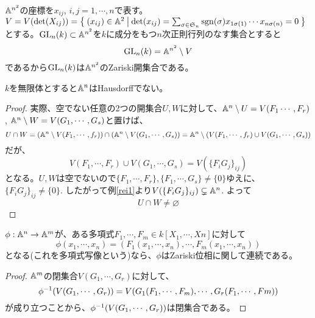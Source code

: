 \documentclass{ltjsreport}
\begin{document}
\begin{eg}
  $\mathbb{A}^{n^2}$の座標を$x_{ij}$, $i,j=1,\cdots,n$で表す。\\$V=V(\det (X_{ij}))=\left\{\:(x_{ij})\in\mathbb{A}^2\:\middle|\:\det(x_{ij})=\sum_{\sigma\in\mathfrak{S}_n}\mathrm{sgn}(\sigma)x_{1\sigma(1)}\cdots x_{n\sigma(n)}=0\:\right\}$とする。$\text{GL}_n(k)\subset \mathbb{A}^{n^2}$を$k$に成分をもつ$n$次正則行列のなす集合とすると
  \[
  \text{GL}_n(k)=\mathbb{A}^{n^2}\setminus V  
  \]
  であるから$\text{GL}_n(k)$は$\mathbb{A}^{n^2}$のZariski開集合である。
\end{eg}

\begin{prop}
  $k$を無限体とすると$\mathbb{A}^n$はHausdorffでない。
\end{prop}

\begin{proof}
  実際、空でない任意の2つの開集合$U,W$に対して、$\mathbb{A}^n\setminus U=V(F_1\cdots,F_r)$, $\mathbb{A}^n\setminus W=V(G_1,\cdots,G_s)$と置けば、
  \[
  U\cap W=(\mathbb{A}^n \setminus V(F_1,\cdots,f_r))\cap (\mathbb{A}^n \setminus V(G_1,\cdots,G_s))=\mathbb{A}^n\setminus(V(F_1,\cdots,f_r)\cup V(G_1,\cdots,G_s))  
  \]
  だが、
  \[
    V(F_1,\cdots,F_r)\cup V(G_1,\cdots,G_s)=V(\{F_iG_j\}_{ij}) 
  \]
  となる。$U,W$は空でないので$\{F_1,\cdots,F_r\},\{F_1,\cdots,G_s\}\neq \{0\}$ゆえに、$\{F_iG_j\}_{ij}\neq \{0\}$. したがって例\ref{rei1}より$V(\{F_iG_j\}_{ij})\subsetneq \mathbb{A}^n$. よって
  \[
  U\cap W\neq \varnothing
  \]
\end{proof}

\begin{prop}\label{continuity}
  $\phi:\mathbb{A}^n\rightarrow \mathbb{A}^m$が、ある多項式$F_1,\cdots,F_m\in k[X_1,\cdots,Xn]$に対して
  \[
  \phi(x_1,\cdots,x_n)=(F_1(x_1,\cdots,x_n),\cdots,F_m(x_1,\cdots,x_n))  
  \]
  となる(これを多項式写像という)なら、$\phi$はZariski位相に関して連続である。
\end{prop}

\begin{proof}
  $\mathbb{A}^m$の閉集合$V(G_1,\cdots,G_r)$に対して、
  \[
  \phi^{-1}(V(G_1,\cdots,G_r))=V(G_1(F_1,\cdots,F_m),\cdots,G_r(F_1,\cdots,Fm))  
  \]
  が成り立つことから、$\phi^{-1}(V(G_1,\cdots,G_r))$は閉集合である。
\end{proof}
\end{document}
